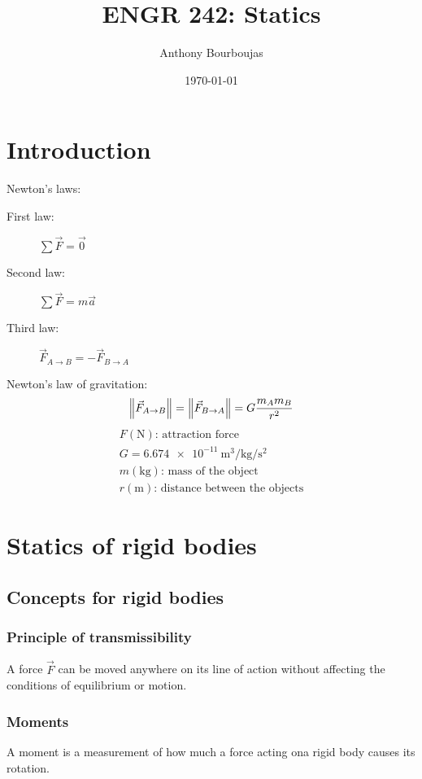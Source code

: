 \documentclass[10pt, twocolumn]{article}
\title{ENGR 242: Statics}
\date{\today}
\author{Anthony Bourboujas}
\begin{document}
\maketitle %

\section{Introduction}
Newton's laws:
\begin{description}
  \item[First law:] \(\sum{\vec{F}} = \vec{0}\)
  \item[Second law:] \(\sum{\vec{F}} = m\vec{a}\)
  \item[Third law:] \(\vec{F}_{A \to B} = - \vec{F}_{B \to A}\)
\end{description}

Newton's law of gravitation:
\[
  \left\| \vec{F}_{A \to B} \right\| = \left\| \vec{F}_{B \to A} \right\| = G \frac{m_A m_B}{r^2}
\]
\[
  \begin{array}{|l}
    F (\si{\newton}) \text{: attraction force}                         \\
    G = \SI{6.674 e-11}{\metre\cubed\per\kilo\gram\per\second\squared} \\
    m (\si{\kilo\gram}) \text{: mass of the object}                    \\
    r (\si{\metre}) \text{: distance between the objects}
  \end{array}
\]

\section{Statics of rigid bodies}
\subsection{Concepts for rigid bodies}
\subsubsection{Principle of transmissibility}
A force \(\vec{F}\) can be moved anywhere on its line of action without affecting the conditions of equilibrium or motion.

\subsubsection{Moments}
A moment is a measurement of how much a force acting ona rigid body causes its rotation.
\end{document}
